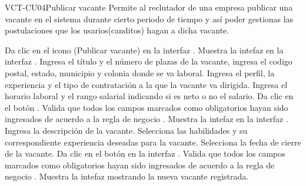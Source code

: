 \clearpage
\begin{UseCase}[]{VCT-CU04}{Publicar vacante}{
	Permite al reclutador de una empresa  publicar una vacante en el sistema durante cierto periodo de tiempo y así poder gestionas las postulaciones 
	que los usarios(canditos) hagan a dicha vacante.
	}
\end{UseCase}

\begin{UCtrayectoria}
	\UCpaso [\UCactor] Da clic en el icono \IUAgregar{} (Publicar vacante) en la interfaz .
	\UCpaso [\UCsist] Muestra la intefaz  en la interfaz .
	\UCpaso [\UCactor] \label{VCT-CU04:vadata} Ingresa el título y el número de plazas de la vacante, ingresa el codigo postal, estado, municipio y colonia donde 
	se va laboral.
	\UCpaso [\UCactor] Ingresa el perfil, la experiencia y el tipo de contratación a la que la vacante va dirigida.
	\UCpaso [\UCactor] Ingresa el horario laboral y el rango salarial indicando si es neto o no el salario.
	\UCpaso [\UCactor] Da clic en el botón .  
	\UCpaso [\UCsist] Valida que todos los campos marcados como obligatorios hayan sido ingresados de acuerdo a la regla de negocio . 
	\UCpaso [\UCsist] Muestra la intefaz  en la interfaz .  
	\UCpaso [\UCactor] Ingresa la descripción de la vacante.
	\UCpaso [\UCactor] \label{VCT-CU04:hab}Selecciona las habilidades y su correspondiente experiencia deseadas para la vacante.
	\UCpaso [\UCactor] Selecciona la fecha de cierre de la vacante.
	\UCpaso [\UCactor] Da clic en el botón  en la interfaz . 
	\UCpaso [\UCsist] \label{VCT-CU04:vadata2}Valida que todos los campos marcados como obligatorios hayan sido ingresados de acuerdo a la regla de negocio .
	\UCpaso [\UCsist] Muestra la intefaz  mostrando la nueva vacante registrada.
\end{UCtrayectoria}

